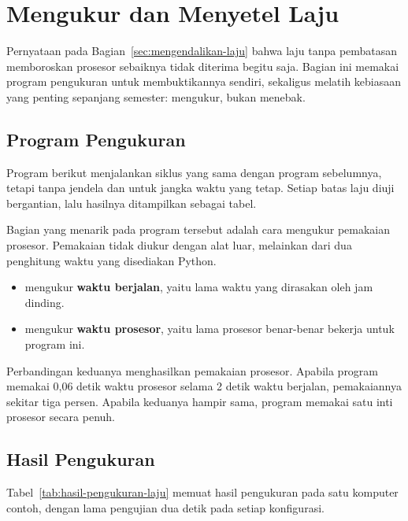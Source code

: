 \section{Mengukur dan Menyetel Laju}
\label{sec:mengukur-laju}

Pernyataan pada Bagian~\ref{sec:mengendalikan-laju} bahwa laju tanpa
pembatasan memboroskan prosesor sebaiknya tidak diterima begitu saja.
Bagian ini memakai program pengukuran untuk membuktikannya sendiri, sekaligus
melatih kebiasaan yang penting sepanjang semester: mengukur, bukan menebak.

\subsection{Program Pengukuran}

Program berikut menjalankan siklus yang sama dengan program sebelumnya,
tetapi tanpa jendela dan untuk jangka waktu yang tetap. Setiap batas laju
diuji bergantian, lalu hasilnya ditampilkan sebagai tabel.


Bagian yang menarik pada program tersebut adalah cara mengukur pemakaian
prosesor. Pemakaian tidak diukur dengan alat luar, melainkan dari dua
penghitung waktu yang disediakan Python.

\begin{itemize}
  \item {} mengukur \textbf{waktu berjalan}, yaitu lama
        waktu yang dirasakan oleh jam dinding.
  \item {} mengukur \textbf{waktu prosesor}, yaitu
        lama prosesor benar-benar bekerja untuk program ini.
\end{itemize}

Perbandingan keduanya menghasilkan pemakaian prosesor. Apabila program
memakai 0,06 detik waktu prosesor selama 2 detik waktu berjalan, pemakaiannya
sekitar tiga persen. Apabila keduanya hampir sama, program memakai satu inti
prosesor secara penuh.

\subsection{Hasil Pengukuran}

Tabel~\ref{tab:hasil-pengukuran-laju} memuat hasil pengukuran pada satu
komputer contoh, dengan lama pengujian dua detik pada setiap konfigurasi.

